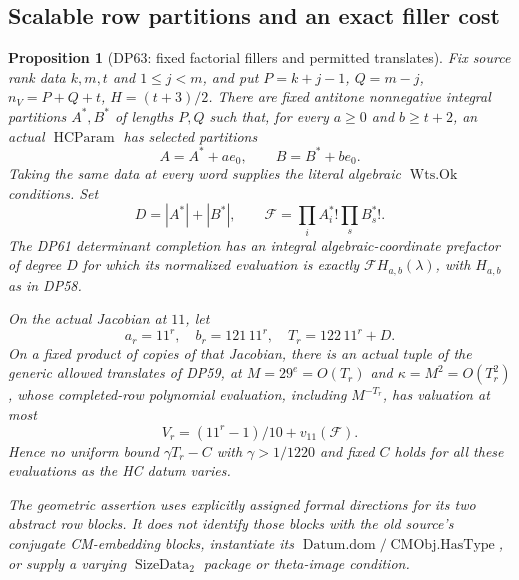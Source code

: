 \documentclass[11pt,a4paper]{article}
\newtheorem{proposition}[theorem]{Proposition}
\theoremstyle{definition}\newtheorem{remark}[theorem]{Remark}
\begin{document}
\subsection{Scalable row partitions and an exact filler cost}

\begin{proposition}[DP63: fixed factorial fillers and permitted translates]\label{DP63}
Fix source rank data $k,m,t$ and $1\le j<m$, and put
$P=k+j-1$, $Q=m-j$, $n_V=P+Q+t$, $H=(t+3)/2$.
There are fixed antitone nonnegative integral partitions $A^*,B^*$ of
lengths $P,Q$ such that, for every $a\ge0$ and $b\ge t+2$, an actual
$\operatorname{HCParam}$ has selected partitions
\[
 A=A^*+ae_0,\qquad B=B^*+be_0.
\]
Taking the same data at every word supplies the literal algebraic
$\operatorname{Wts.Ok}$ conditions. Set
\[
 D=|A^*|+|B^*|,\qquad
 \mathcal F=\prod_i A_i^*!\prod_s B_s^*!.
\]
The DP61 determinant completion has an integral algebraic-coordinate
prefactor of degree $D$ for which its normalized evaluation is exactly
$\mathcal F H_{a,b}(\lambda)$, with $H_{a,b}$ as in DP58.

On the actual Jacobian at $11$, let
\[
 a_r=11^r,\quad b_r=121\,11^r,\quad T_r=122\,11^r+D.
\]
On a fixed product of copies of that Jacobian, there is an actual tuple
of the generic allowed translates of DP59, at
$M=29^e=O(T_r)$ and $\kappa=M^2=O(T_r^2)$, whose completed-row
polynomial evaluation, including $M^{-T_r}$, has valuation at most
\[
 V_r=(11^r-1)/10+v_{11}(\mathcal F).
\]
Hence no uniform bound $\gamma T_r-C$ with $\gamma>1/1220$ and fixed
$C$ holds for all these evaluations as the HC datum varies.

The geometric assertion uses explicitly assigned formal directions for
its two abstract row blocks. It does not identify those blocks with the
old source's conjugate CM-embedding blocks, instantiate its
$\operatorname{Datum.dom}/\operatorname{CMObj.HasType}$, or supply a
varying $\operatorname{SizeData}_2$ package or theta-image condition.
\end{proposition}
\end{document}
